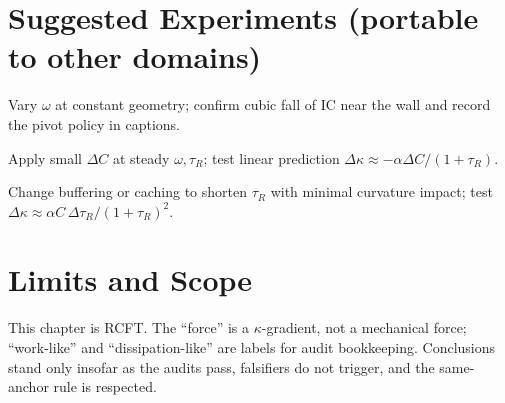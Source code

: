 \section{Suggested Experiments (portable to other domains)}
\begin{description}[leftmargin=1.2em,labelindent=0em,style=nextline]
  \item[Fixed-\(C,\tau_R\) drift sweep] Vary \(\omega\) at constant geometry; confirm cubic fall of IC near the wall and record the pivot policy in captions.
  \item[Curvature micro-edits] Apply small \(\Delta C\) at steady \(\omega,\tau_R\); test linear prediction \(\Delta\kappa\approx -\alpha\Delta C/(1+\tau_R)\).
  \item[Return-window tuning] Change buffering or caching to shorten \(\tau_R\) with minimal curvature impact; test \(\Delta\kappa\approx \alpha C\,\Delta\tau_R/(1+\tau_R)^2\).
\end{description}

\section{Limits and Scope}
This chapter is RCFT. The “force” is a $\kappa$-gradient, not a mechanical force; “work-like” and “dissipation-like” are labels for audit bookkeeping. Conclusions stand only insofar as the audits pass, falsifiers do not trigger, and the same-anchor rule is respected.
